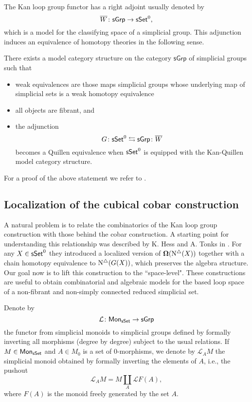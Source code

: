 The Kan loop group functor has a right adjoint usually denoted by 
$$\overline{W} \colon \mathsf{sGrp} \to \mathsf{sSet}^0,$$ which is a model for the classifying space of a simplicial group.
This adjunction induces an equivalence of homotopy theories in the following sense.

\begin{theorem} \label{kan}
	There exists a model category structure on the category $\mathsf{sGrp}$ of simplicial groups such that 
	\begin{itemize}
	    \item weak equivalences are those maps simplicial groups whose underlying map of simplicial sets is a weak homotopy equivalence
	    \item all objects are fibrant, and
		\item the adjunction
		$$G \colon \mathsf{sSet}^0 \leftrightarrows \mathsf{sGrp}\colon \overline{W}$$
		becomes a Quillen equivalence when $\mathsf{sSet}^0$ is equipped with the Kan-Quillen model category structure.
	\end{itemize}
\end{theorem}


For a proof of the above statement we refer to \cite[Chapter V]{goerss2009simplicial}.

\subsection{Localization of the cubical cobar construction}

A natural problem is to relate the combinatorics of the Kan loop group construction with those behind the cobar construction.
A starting point for understanding this relationship was described by K. Hess and A. Tonks in \cite{hess2010cobar}.
For any $X \in \mathsf{sSet}^0$ they introduced a localized version of $\operatorname{\mathbf{\Omega}}(\operatorname{N^{\triangle}}(X))$ together with a chain homotopy equivalence to $\operatorname{N^{\triangle}} (G(X))$, which preserves the algebra structure.
Our goal now is to lift this construction to the ``space-level".
These constructions are useful to obtain combinatorial and algebraic models for the based loop space of a non-fibrant and non-simply connected reduced simplicial set.

Denote by $$\mathcal{L} \colon \mathsf{Mon}_{\mathsf{sSet}} \to \mathsf{sGrp}$$ the functor from simplicial monoids to simplicial groups defined by formally inverting all morphisms (degree by degree) subject to the usual relations.
If $M \in \mathsf{Mon}_{\mathsf{sSet}}$ and $A \in M_0$ is a set of $0$-morphisms, we denote by $\mathcal{L}_AM$ the simplicial monoid obtained by formally inverting the elements of $A$, i.e., the pushout
$$\mathcal{L}_AM = M \coprod_{A} \mathcal{L}F(A),$$
where $F(A)$ is the monoid freely generated by the set $A$.

